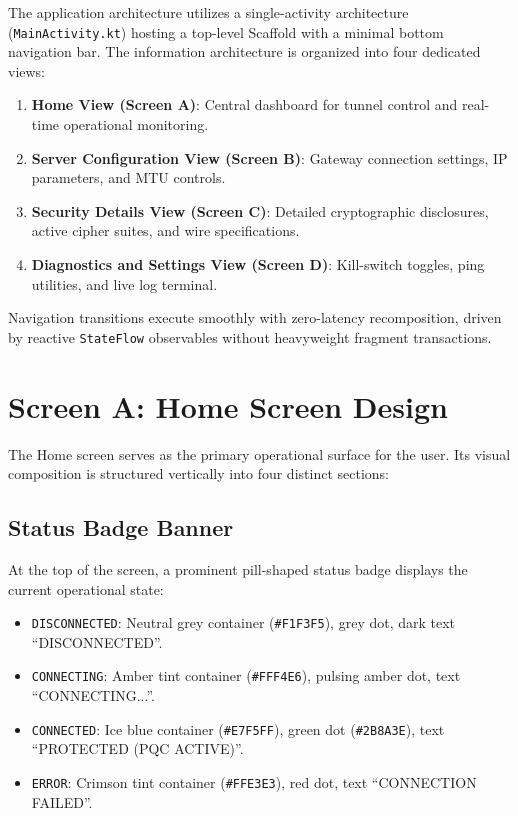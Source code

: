 The application architecture utilizes a single-activity architecture (\texttt{MainActivity.kt}) hosting a top-level Scaffold with a minimal bottom navigation bar. The information architecture is organized into four dedicated views:

\begin{enumerate}
    \item \textbf{Home View (Screen A)}: Central dashboard for tunnel control and real-time operational monitoring.
    \item \textbf{Server Configuration View (Screen B)}: Gateway connection settings, IP parameters, and MTU controls.
    \item \textbf{Security Details View (Screen C)}: Detailed cryptographic disclosures, active cipher suites, and wire specifications.
    \item \textbf{Diagnostics and Settings View (Screen D)}: Kill-switch toggles, ping utilities, and live log terminal.
\end{enumerate}

Navigation transitions execute smoothly with zero-latency recomposition, driven by reactive \texttt{StateFlow} observables without heavyweight fragment transactions.

\section{Screen A: Home Screen Design}
\label{sec:screen_home_design}

The Home screen serves as the primary operational surface for the user. Its visual composition is structured vertically into four distinct sections:

\subsection{Status Badge Banner}
At the top of the screen, a prominent pill-shaped status badge displays the current operational state:
\begin{itemize}
    \item \texttt{DISCONNECTED}: Neutral grey container (\texttt{\#F1F3F5}), grey dot, dark text ``DISCONNECTED''.
    \item \texttt{CONNECTING}: Amber tint container (\texttt{\#FFF4E6}), pulsing amber dot, text ``CONNECTING...''.
    \item \texttt{CONNECTED}: Ice blue container (\texttt{\#E7F5FF}), green dot (\texttt{\#2B8A3E}), text ``PROTECTED (PQC ACTIVE)''.
    \item \texttt{ERROR}: Crimson tint container (\texttt{\#FFE3E3}), red dot, text ``CONNECTION FAILED''.
\end{itemize}

